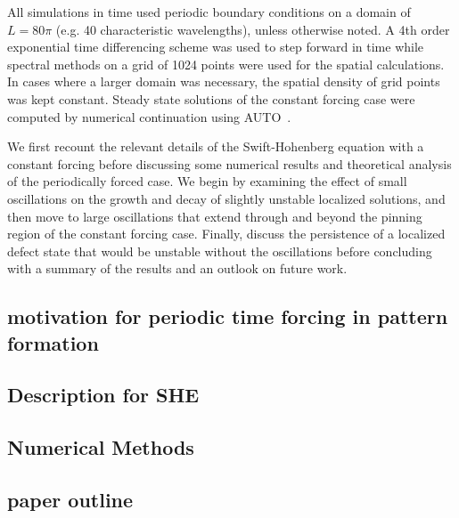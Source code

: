 \documentclass[../main/TimeForcingSHE.tex]{subfiles}
\begin{document}
All simulations in time used periodic boundary conditions on a domain of $L=80\pi$ (e.g. 40 characteristic wavelengths), unless otherwise noted.  A 4th order exponential time differencing scheme\cite{cox2002} was used to step forward  in time while spectral methods on a grid of 1024 points were used for the spatial calculations.  In cases where a larger domain was necessary, the spatial density of grid points was kept constant.    Steady state solutions of the constant forcing case were computed by numerical continuation using AUTO~\cite{doedel1981auto}.  


We first recount the relevant details of the Swift-Hohenberg equation with a constant forcing before discussing some numerical results and theoretical analysis of the periodically forced case.   We begin by examining the  effect of small oscillations on the growth and decay of slightly  unstable localized solutions, and then move to large oscillations that extend through and beyond the pinning region of the constant forcing case.  Finally, discuss the persistence of a localized defect state that would be unstable without the oscillations before concluding with a summary of the results and an outlook on future work.

\subsection{motivation for periodic time forcing in pattern formation}
\subsection{Description for SHE}
\subsection{Numerical Methods}
\subsection{paper outline}



\end{document}
